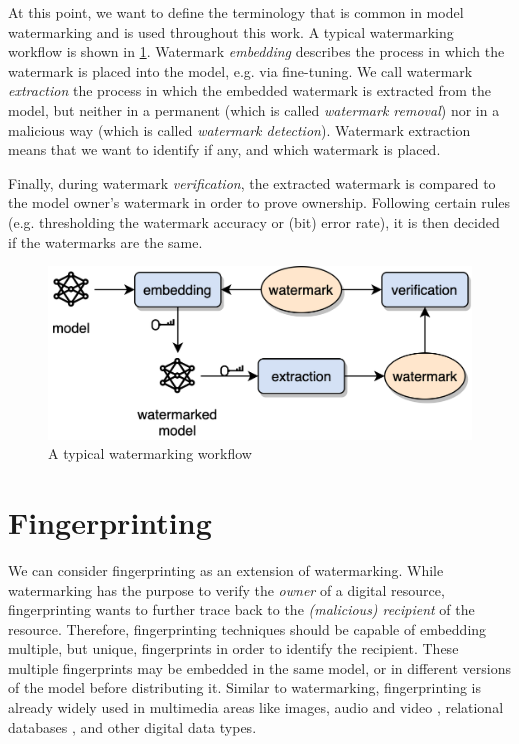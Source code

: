 At this point, we want to define the terminology that is common in model watermarking and is used throughout this work. A typical watermarking workflow is shown in \cref{fig:watermarking_workflow}. Watermark \textit{embedding} describes the process in which the watermark is placed into the model, e.g. via fine-tuning. We call watermark \textit{extraction} the process in which the embedded watermark is extracted from the model, but neither in a permanent (which is called \textit{watermark removal}) nor in a malicious way (which is called \textit{watermark detection}). Watermark extraction means that we want to identify if any, and which watermark is placed. 

Finally, during watermark \textit{verification}, the extracted watermark is compared to the model owner's watermark in order to prove ownership. Following certain rules (e.g. thresholding the watermark accuracy or (bit) error rate), it is then decided if the watermarks are the same.

\begin{figure}
    \centering
    \includegraphics[width= 0.7\linewidth]{images/watermarking_workflow.png}
    \caption{A typical watermarking workflow}
    \label{fig:watermarking_workflow}
\end{figure}

\section{Fingerprinting}
We can consider fingerprinting as an extension of watermarking. While watermarking has the purpose to verify the \textit{owner} of a digital resource, fingerprinting wants to further trace back to the \textit{(malicious) recipient} of the resource. Therefore, fingerprinting techniques should be capable of embedding multiple, but unique, fingerprints in order to identify the recipient. These multiple fingerprints may be embedded in the same model, or in different versions of the model before distributing it.
%
Similar to watermarking, fingerprinting is already widely used in multimedia areas like images, audio and video \cite{lach_fpga_1998}, %
relational databases \cite{yingjiu_li_fingerprinting_2005}, and other digital data types.



